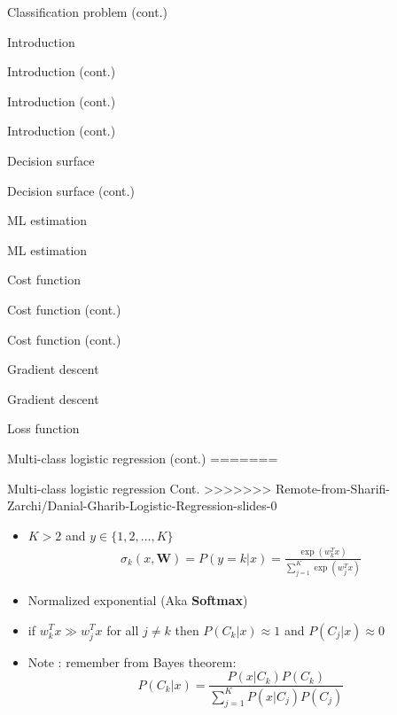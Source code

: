 \documentclass[serif, aspectratio=169]{beamer}
\begin{document}
\begin{frame}{Classification problem (cont.)}
\begin{itemize}
\begin{frame}{Introduction}
\begin{itemize}
\begin{frame}{Introduction (cont.)}
\begin{frame}{Introduction (cont.)}
\begin{frame}{Introduction (cont.)}
\begin{frame}{Decision surface}
\begin{itemize}
\begin{frame}{Decision surface (cont.)}
\begin{frame}{ML estimation}
\begin{frame}{ML estimation}
\begin{itemize}
\begin{frame}{Cost function}
\begin{frame}{Cost function (cont.)}
\begin{itemize}
\begin{itemize}
\begin{frame}{Cost function (cont.)}
\begin{frame}{Gradient descent}
\begin{frame}{Gradient descent}
\begin{frame}{Loss function}
\begin{frame}{Multi-class logistic regression (cont.)}
=======
\begin{frame}{Multi-class logistic regression Cont.}
>>>>>>> Remote-from-Sharifi-Zarchi/Danial-Gharib-Logistic-Regression-slides-0
    \begin{itemize}
        \item $K > 2$ and $y \in \{1,2,\dots,K\}$
        \begin{align*}
            \sigma _k(x, \mathbf{W}) = P(y=k|x) = \frac{\exp{(w^T_kx)}}{\sum_{j=1}^{K}\exp{(w_j^Tx)}}
        \end{align*}
        \item Normalized exponential (Aka \textbf{Softmax})
          
            \item if $w_k^Tx \gg w_j^Tx$ for all $j \neq k$ then $P(C_k|x) \approx 1$ and $P(C_j|x) \approx 0$
            \item Note : remember from Bayes theorem:
                \[
                P(C_k|x) = \frac{P(x|C_k)P(C_k)}
            {\sum_{j=1}^{K}P(x|C_j)P(C_j)}
                \]
          

\end{itemize}
\end{frame}
\end{frame}
\end{frame}
\end{frame}
\end{frame}
\end{frame}
\end{itemize}
\end{itemize}
\end{frame}
\end{frame}
\end{itemize}
\end{frame}
\end{frame}
\end{frame}
\end{itemize}
\end{frame}
\end{frame}
\end{frame}
\end{frame}
\end{itemize}
\end{frame}
\end{itemize}
\end{frame}
\end{document}
